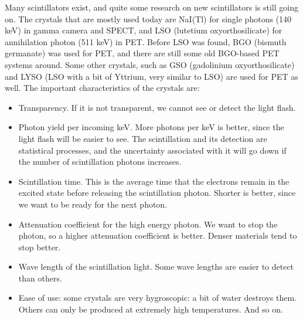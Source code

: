 \documentclass[11pt,oneside]{article}
\begin{document}
Many scintillators exist, and quite some research on new scintillators
is still going on. The crystals that are mostly used today are NaI(Tl)
for single photons (140 keV) in gamma camera and SPECT, and LSO
(lutetium oxyorthosilicate) for annihilation photon (511 keV) in
PET. Before LSO was found, BGO (bismuth germanate) was used for PET,
and there are still some old BGO-based PET systems around. Some other
crystals, such as GSO (gadolinium oxyorthosilicate) and LYSO (LSO with
a bit of Yttrium, very similar to LSO) are used for PET as well. The
important characteristics of the crystals are:
\begin{itemize}
  \item Transparency. If it is not transparent, we cannot see or detect the
        light flash.
  \item Photon yield per incoming keV. More photons per keV is better, since
        the light flash will be easier to see. The scintillation and
        its detection are statistical processes, and the uncertainty
        associated with it will go down if the number of scintillation
        photons increases.
  \item Scintillation time. This is the average time that the electrons
        remain in the excited state before releasing the scintillation
        photon. Shorter is better, since we want to be ready for the next
        photon.
  \item Attenuation coefficient for the high energy photon. We want to stop
        the photon, so a higher attenuation coefficient is better. Denser
        materials tend to stop better.
  \item Wave length of the scintillation light. Some wave lengths are easier
        to detect than others.
  \item Ease of use: some crystals are very hygroscopic: a bit of water
        destroys them. Others can only be produced at extremely high
        temperatures. And so on.
\end{itemize}
\end{document}
